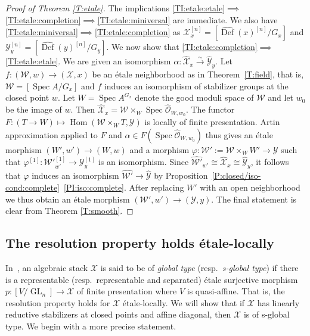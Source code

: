 \documentclass[a4paper]{amsart}
\theoremstyle{plain}
\theoremstyle{definition}
\theoremstyle{remark}
\numberwithin{equation}{section}
\newcommand\cW{\mathcal{W}}
\newcommand\cX{\mathcal{X}}
\newcommand\cY{\mathcal{Y}}
\newcommand\oh{\mathcal{O}}
\newcommand\co{\colon}
\DeclareMathOperator{\Spec}{Spec}
\DeclareMathOperator{\GL}{GL}
\newcommand{\iso}{\stackrel{\sim}{\to}}
\renewcommand{\hat}{\widehat}
\newcommand{\itemref}[1]{\eqref{#1}}
\DeclareMathOperator{\Def}{Def}
\DeclareMathOperator{\Hom}{Hom}
\begin{document}
\begin{proof}[Proof of Theorem \ref{T:etale}]
The implications \itemref{TI:etale:etale}$\implies$\itemref{TI:etale:completion}$\implies$\itemref{TI:etale:miniversal} are immediate.  We also have \itemref{TI:etale:miniversal}$\implies$\itemref{TI:etale:completion} as $\cX_x^{[n]} = [\hat{\Def}(x)^{[n]} / G_x]$ and $\cY_y^{[n]} = [\hat{\Def}(y)^{[n]} / G_y]$.  We now show that \itemref{TI:etale:completion}$\implies$\itemref{TI:etale:etale}. We are given an isomorphism $\alpha \co\hat{\cX}_x \iso \hat{\cY}_y$. Let
$f \co (\cW,w)\to (\cX,x)$ be an \'etale neighborhood as in
Theorem~\ref{T:field}, that is, $\cW = [\Spec A/G_x]$ and $f$ induces an isomorphism of stabilizer groups at the closed point $w$. Let $W=\Spec A^{G_x}$ denote the good moduli space of
$\cW$ and let $w_0$ be the image of $w$. Then $\hat{\cX}_x=\cW\times_W \Spec
\hat{\oh}_{W,w_0}$.  The functor $F\co (T\to W)\mapsto \Hom(\cW\times_W T,\cY)$
is locally of finite presentation. Artin approximation applied to $F$ and
$\alpha\in F(\Spec \hat{\oh}_{W,w_0})$ thus gives an \'etale morphism
$(W',w')\to (W,w)$ and a morphism $\varphi\co \cW':=\cW\times_W W'\to \cY$ such
that $\varphi^{[1]}\co \cW'^{[1]}_{w'}\to \cY_y^{[1]}$ is an isomorphism.
Since $\hat{\cW'}_{w'}\cong \hat{\cX}_x\cong \hat{\cY}_y$, it
follows that $\varphi$ induces an isomorphism $\hat{\cW'}\to \hat{\cY}$ by
Proposition~\ref{P:closed/iso-cond:complete}~\itemref{PI:iso:complete}. After replacing $W'$ with an open
neighborhood we thus obtain an \'etale morphism $(\cW',w')\to (\cY,y)$.
%
The final statement is clear from Theorem \ref{T:smooth}.
\end{proof}


\subsection{The resolution property holds \'etale-locally}\label{A:resolution-property-etale}
In~\cite[Def.~2.1]{rydh-noetherian}, an algebraic stack $\cX$
is said to be of \emph{global type} (resp.\ \emph{s-global type}) if there
is a representable (resp.\ representable and separated) \'etale surjective
morphism $p\colon [V/\GL_n]\to \cX$ of finite presentation where $V$ is
quasi-affine. That is, the resolution property holds for $\cX$
\'etale-locally. We will show that if $\cX$ has linearly reductive stabilizers
at closed points and affine diagonal, then $\cX$ is of s-global type. We begin
with a more precise statement.
\end{document}
